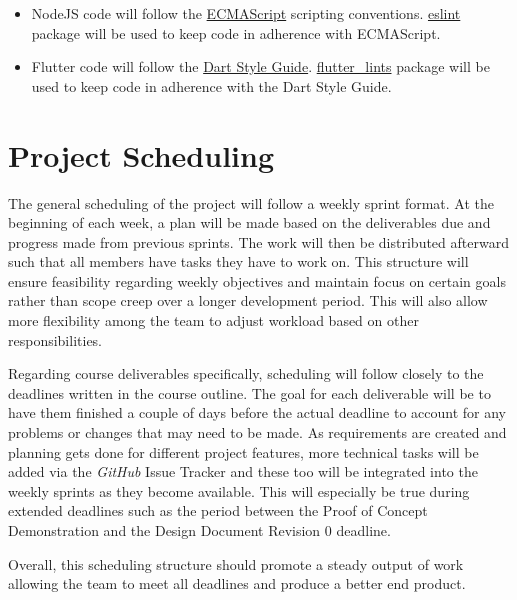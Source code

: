\documentclass{article}
\begin{document}
\begin{itemize}
\item NodeJS code will follow the \href{https://www.ecma-international.org/publications-and-standards/standards/ecma-262/}{ECMAScript} scripting conventions. \href{https://www.npmjs.com/package/eslint}{eslint} package will be used to keep code in adherence with ECMAScript.
\item Flutter code will follow the \href{https://dart.dev/effective-dart/style}{Dart Style Guide}. \href{https://pub.dev/packages/flutter_lints}{flutter\_lints} package will be used to keep code in adherence with the Dart Style Guide.
\end{itemize}

\section{Project Scheduling}

The general scheduling of the project will follow a weekly sprint format. At the beginning
of each week, a plan will be made based on the deliverables due and progress made from previous sprints. The
work will then be distributed afterward such that all members have tasks they have
to work on. This structure will ensure feasibility regarding weekly
objectives and maintain focus on certain goals rather than scope creep over
a longer development period. This will also allow more flexibility among the team to adjust workload
based on other responsibilities. \par

Regarding course deliverables specifically, scheduling will follow closely to the deadlines written in the
course outline. The goal for each deliverable will be to have them finished a couple of days
before the actual deadline to account for any problems or changes that may
need to be made. As requirements are created and planning gets done for different project features,
more technical tasks will be added via the \emph{GitHub} Issue Tracker and these too will be
integrated into the weekly sprints as they become available. This will especially be true during
extended deadlines such as the period between the Proof of Concept Demonstration and
the Design Document Revision 0 deadline. \par

Overall, this scheduling structure should promote a steady output of work allowing the team
to meet all deadlines and produce a better end product.
\end{document}
